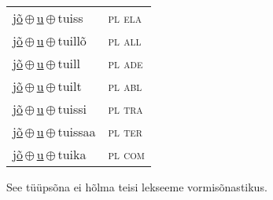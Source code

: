 \begin{minipage}{\textwidth}
\begin{sideways}
\begin{tabular}{l l}
\underline{jõ}\,$\oplus$\,\underline{u}\,$\oplus$\,tuiss & \textsc{ pl ela } \\
\underline{jõ}\,$\oplus$\,\underline{u}\,$\oplus$\,tuillõ & \textsc{ pl all } \\
\underline{jõ}\,$\oplus$\,\underline{u}\,$\oplus$\,tuill & \textsc{ pl ade } \\
\underline{jõ}\,$\oplus$\,\underline{u}\,$\oplus$\,tuilt & \textsc{ pl abl } \\
\underline{jõ}\,$\oplus$\,\underline{u}\,$\oplus$\,tuissi & \textsc{ pl tra } \\
\underline{jõ}\,$\oplus$\,\underline{u}\,$\oplus$\,tuissaa & \textsc{ pl ter } \\
\underline{jõ}\,$\oplus$\,\underline{u}\,$\oplus$\,tuika & \textsc{ pl com } \\
\end{tabular}
\end{sideways}
\label{tab:tüüpsõnamall-jõutu}

\end{minipage}

 
\vspace{1em}
\noindent See tüüpsõna ei hõlma teisi lekseeme vormi\-sõnastikus.
